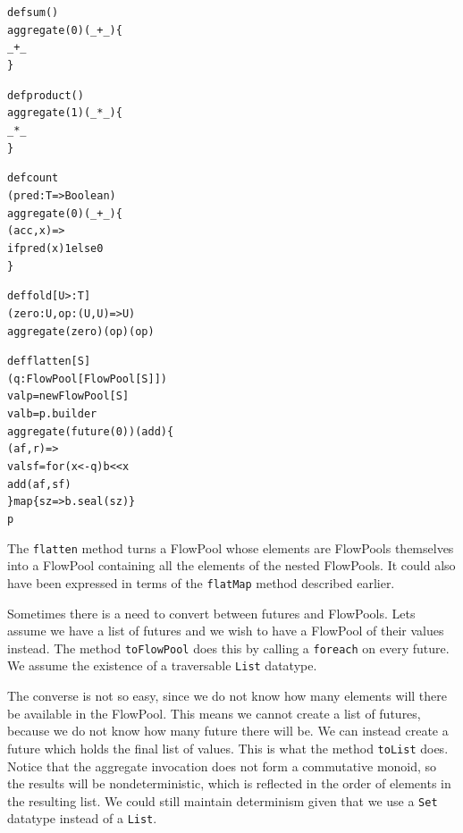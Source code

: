 \documentclass[runningheads,a4paper]{llncs}
\begin{document}
\noindent
\begin{minipage}[b]{3.9 cm}
\begin{alltt}
{\scriptsize
def sum()
  aggregate(0)(_ + _) \{
    _ + _
  \}



def product()
  aggregate(1)(_ * _) \{
    _ * _
  \}

}
\end{alltt}
\end{minipage}
\begin{minipage}[b]{3.9 cm}
\begin{alltt}
{\scriptsize
def count
  (pred: T => Boolean)
  aggregate(0)(_ + _) \{
    (acc, x) =>
    if pred(x) 1 else 0
  \}


def fold[U >: T]
  (zero: U, op: (U, U) => U)
  aggregate(zero)(op)(op)
}
\end{alltt}
\end{minipage}
\begin{minipage}[b]{4.7 cm}
\begin{alltt}
{\scriptsize
def flatten[S]
  (q: FlowPool[FlowPool[S]])
  val p = new FlowPool[S]
  val b = p.builder
  aggregate(future(0))(add) \{
    (af, r) =>
    val sf = for (x <- q) b << x
    add(af, sf)
  \} map \{ sz => b.seal(sz) \}
  p

}
\end{alltt}
\end{minipage}

The \verb=flatten= method turns a FlowPool whose elements
are FlowPools themselves into a FlowPool containing all the
elements of the nested FlowPools.
It could also have been expressed in terms
of the \verb=flatMap= method described earlier.

Sometimes there is a need to convert between futures
and FlowPools.
Lets assume we have a list of futures and we wish to
have a FlowPool of their values instead.
The method \verb=toFlowPool= does this by calling a
\verb=foreach= on every future.
We assume the existence of a traversable \verb=List=
datatype.

The converse is not so easy, since we do not know how
many elements will there be available in the FlowPool.
This means we cannot create a list of futures, because
we do not know how many future there will be.
We can instead create a future which holds the final
list of values.
This is what the method \verb=toList= does. 
Notice that the aggregate invocation does not form a
commutative monoid, so the results will be nondeterministic,
which is reflected in the order of elements in the
resulting list.
We could still maintain determinism given that we use
a \verb=Set= datatype instead of a \verb=List=.
\end{document}
